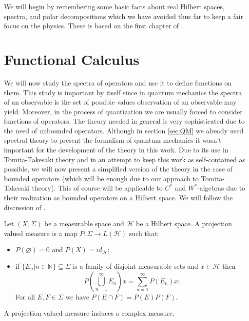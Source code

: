 We will begin by remembering some basic facts about real Hilbert spaces, spectra, and polar decompositions which we have avoided thus far to keep a fair focus on the physics. These is based on the first chapter of \cite{Duvenhage1999}.

\section{Functional Calculus}

We will now study the spectra of operators and use it to define functions on them. This study is important by itself since in quantum mechanics the spectra of an observable is the set of possible values observation of an observable may yield. Moreover, in the process of quantization we are usually forced to consider functions of operators. The theory needed in general is very sophisticated due to the need of unbounded operators. Although in section \ref{sec:QM} we already used spectral theory to present the formalism of quantum mechanics it wasn't important for the development of the theory in this work. Due to its use in Tomita-Takesaki theory and in an attempt to keep this work as self-contained as possible, we will now present a simplified version of the theory in the case of bounded operators (which will be enough due to our approach to Tomita-Takesaki theory). This of course will be applicable to $C^*$ and $W^*$-algebras due to their realization as bounded operators on a Hilbert space. We will follow the discussion of \cite{Hall2013}.

\begin{definition}
Let $(X,\Sigma)$ be a measurable space and $\mathcal{H}$ be a Hilbert space. A projection valued measure is a map $P:\Sigma\rightarrow L(\mathcal{H})$ such that:
\begin{itemize}
\item $P(\varnothing) = 0$ and $P(X)=id_{\mathcal{H}}$;
\item if $\{E_n|n\in\mathbb{N}\}\subseteq\Sigma$ is a family of disjoint measurable sets and $x\in\mathcal{H}$ then
\begin{equation}
P\left(\bigcup_{n=1}^\infty E_n\right)x=\sum_{n=1}^\infty P(E_n)x;
\end{equation}
For all $E,F\in\Sigma$ we have $P(E\cap F)=P(E)P(F)$.
\end{itemize}
\end{definition}

A projection valued measure induces a complex measure.

